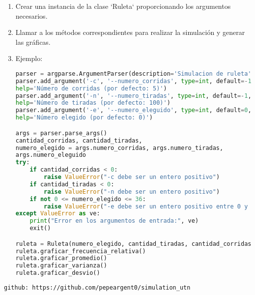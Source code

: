 \documentclass{article}
\begin{document}
\begin{enumerate}
    \item Crear una instancia de la clase `Ruleta` proporcionando los argumentos necesarios.
    \item Llamar a los métodos correspondientes para realizar la simulación y generar las gráficas.
    \item Ejemplo:
    \begin{lstlisting}[language=Python]
parser = argparse.ArgumentParser(description='Simulacion de ruleta')
parser.add_argument('-c', '--numero_corridas', type=int, default=-1,
help='Número de corridas (por defecto: 5)')
parser.add_argument('-n', '--numero_tiradas', type=int, default=-1,
help='Número de tiradas (por defecto: 100)')
parser.add_argument('-e', '--numero_eleguido', type=int, default=0,
help='Número elegido (por defecto: 0)')

args = parser.parse_args()
cantidad_corridas, cantidad_tiradas,
numero_elegido = args.numero_corridas, args.numero_tiradas,
args.numero_eleguido
try:
    if cantidad_corridas < 0:
        raise ValueError("-c debe ser un entero positivo")
    if cantidad_tiradas < 0:
        raise ValueError("-n debe ser un entero positivo")
    if not 0 <= numero_elegido <= 36:
        raise ValueError("-e debe ser un entero positivo entre 0 y 36")
except ValueError as ve:
    print("Error en los argumentos de entrada:", ve)
    exit()

ruleta = Ruleta(numero_elegido, cantidad_tiradas, cantidad_corridas)
ruleta.graficar_frecuencia_relativa()
ruleta.graficar_promedio()
ruleta.graficar_varianza()
ruleta.graficar_desvio()
    \end{lstlisting}
\end{enumerate}
\begin{verbatim}
github: https://github.com/pepeargent0/simulation_utn
\end{verbatim}
\end{document}

